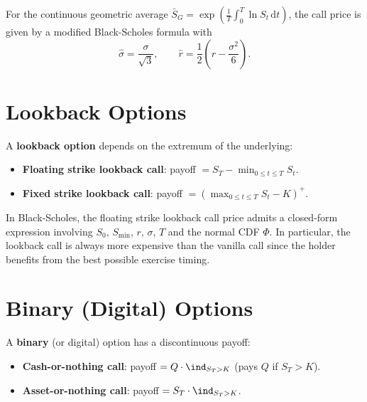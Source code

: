 \begin{theorem}
For the continuous geometric average
$\bar{S}_G = \exp\!\left(\frac{1}{T}\int_0^T \ln S_t\,\mathrm{d}t\right)$,
the call price is given by a modified Black-Scholes formula with
\[
    \hat{\sigma} = \frac{\sigma}{\sqrt{3}}, \qquad
    \hat{r} = \frac{1}{2}\left(r - \frac{\sigma^2}{6}\right).
\]
\end{theorem}

\section{Lookback Options}

\begin{definition}
A \textbf{lookback option} depends on the extremum of the underlying:
\begin{itemize}
    \item \textbf{Floating strike lookback call}:
    payoff $= S_T - \min_{0 \leq t \leq T} S_t$.
    \item \textbf{Fixed strike lookback call}:
    payoff $= (\max_{0 \leq t \leq T} S_t - K)^+$.
\end{itemize}
\end{definition}

\begin{theorem}
In Black-Scholes, the floating strike lookback call price admits a closed-form
expression involving $S_0$, $S_{\min}$, $r$, $\sigma$, $T$ and the normal CDF
$\Phi$. In particular, the lookback call is always more expensive than the
vanilla call since the holder benefits from the best possible exercise timing.
\end{theorem}

\section{Binary (Digital) Options}

\begin{definition}
A \textbf{binary} (or digital) option has a discontinuous payoff:
\begin{itemize}
    \item \textbf{Cash-or-nothing call}: payoff $= Q \cdot \ind_{S_T > K}$
    (pays $Q$ if $S_T > K$).
    \item \textbf{Asset-or-nothing call}: payoff $= S_T \cdot \ind_{S_T > K}$.
\end{itemize}
\end{definition}

